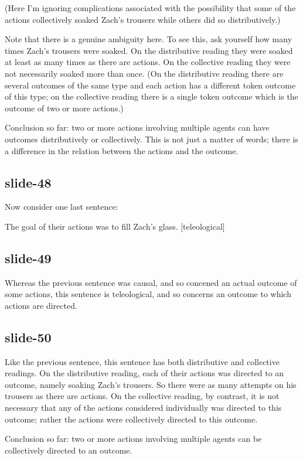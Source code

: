 \documentclass[12pt,\papersize]{extarticle}
\begin{document}
(Here I'm ignoring complications associated with the possibility that some
of the actions collectively soaked Zach’s trousers while others did so distributively.)

Note that there is a genuine ambiguity here.
To see this, ask yourself how many times Zach’s trousers were soaked.
On the distributive reading they were soaked at least as many times as there are actions.
On the collective reading they were not necessarily soaked more than once.
(On the distributive reading there are several outcomes of the same type and each
action has a different token outcome of this type; on the collective reading there is a single token
outcome which is the outcome of two or more actions.)

Conclusion so far: two or more actions involving multiple agents can have outcomes
distributively or collectively.
This is not just a matter of words; there is a difference in the relation between
the actions and the outcome.

\subsection{slide-48}
Now consider one last sentence:

The goal of their actions was to fill Zach’s glass. [teleological]


\subsection{slide-49}
Whereas the previous sentence was causal, and so concened an actual outcome of some actions,
this sentence is teleological, and so concerns an outcome to which actions are directed.

\subsection{slide-50}
Like the previous sentence, this sentence has both distributive and collective readings.
On the distributive reading, each of their actions was directed to an outcome,
namely soaking Zach’s trousers.  So there were as many attempts on his trousers as there
are actions.
On the collective reading, by contrast, it is not necessary that any of the actions
considered individually was directed to this outcome;
rather the actions were collectively directed to this outcome.

Conclusion so far: two or more actions involving multiple agents can be collectively
directed to an outcome.
\end{document}
